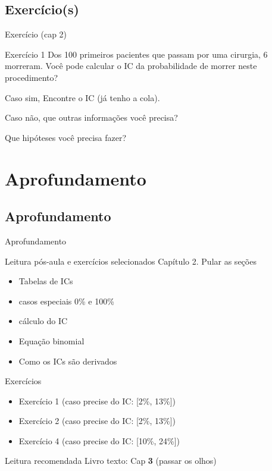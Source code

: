 \documentclass{beamer}
\begin{document}
\subsection{Exercício(s)}

\begin{frame}{Exercício (cap 2)}
  \begin{block}{Exercício 1}
    Dos 100 primeiros pacientes que passam por uma cirurgia, 6 morreram.
    Você pode calcular o IC da probabilidade de morrer neste procedimento?

    Caso sim, Encontre o IC (já tenho a cola).

    Caso não, que outras informações você precisa?

    Que hipóteses você precisa fazer?
  \end{block}
\end{frame}

\section{Aprofundamento}

\subsection{Aprofundamento}

\begin{frame}{Aprofundamento}
  \begin{block}{Leitura pós-aula e exercícios selecionados}
    \footnotesize
    Capítulo 2. Pular as seções
    \begin{itemize}
    \item Tabelas de ICs
    \item casos especiais 0\% e 100\%
    \item cálculo do IC
    \item Equação binomial
    \item Como os ICs são derivados
    \end{itemize}

    Exercícios

    \begin{itemize}
    \item Exercício 1 (caso precise do IC: [2\%, 13\%])
    \item Exercício 2 (caso precise do IC: [2\%, 13\%])
    \item Exercício 4 (caso precise do IC: [10\%, 24\%])
    \end{itemize}
  \end{block}

  \begin{block}{Leitura recomendada}
    \footnotesize
    Livro texto: Cap {\bf 3} (passar os olhos)
  \end{block}
\end{frame}
\end{document}
